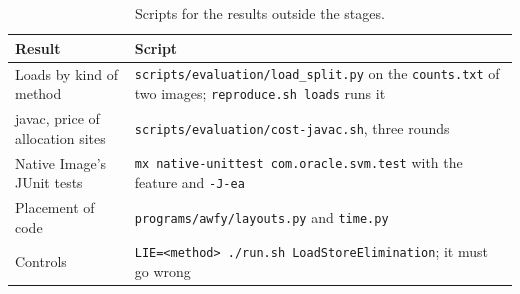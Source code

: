\begin{table}[t]
    \centering
    \caption{Scripts for the results outside the stages.}
    \label{tab:app-scripts}
    \small
    \begin{tabular}{p{4.0cm}p{8.4cm}}
        \toprule
        Result & Script \\
        \midrule
        Loads by kind of method             & \texttt{scripts/evaluation/load\_split.py} on the \texttt{counts.txt} of two images; \texttt{reproduce.sh loads} runs it \\
        javac, price of allocation sites & \texttt{scripts/evaluation/cost-javac.sh}, three rounds \\
        Native Image's JUnit tests          & \texttt{mx native-unittest com.oracle.svm.test} with the feature and \texttt{-J-ea} \\
        Placement of code                   & \texttt{programs/awfy/layouts.py} and \texttt{time.py} \\
        Controls                            & \texttt{LIE=<method> ./run.sh LoadStoreElimination}; it must go wrong \\
        \bottomrule
    \end{tabular}
\end{table}

